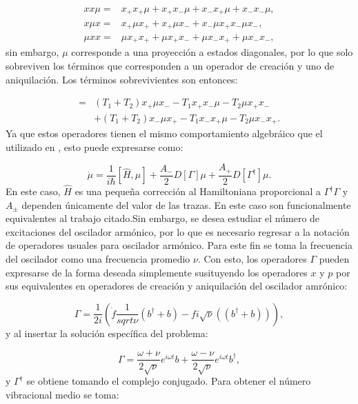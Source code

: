 \documentclass[a4paper,10pt]{report}
\begin{document}
\begin{align}
xx\mu=&x_+x_+\mu + x_+x_-\mu + x_-x_+\mu + x_-x_-\mu,\\
x\mu x=&x_+\mu x_+ + x_+\mu x_- + x_-\mu x_+ x_-\mu x_-,\\
\mu xx=& \mu x_+x_+ + \mu x_+x_-+ \mu x_-x_+ +\mu x_-x_-,
\end{align} sin embargo, $\mu$ corresponde a una proyección a estados diagonales, por lo que solo sobreviven los términos que corresponden a un operador de creación y uno de aniquilación. Los términos sobrevivientes son entonces:

\begin{align}
=&(T_1+T_2)x_+\mu x_- -T_1 x_+x_-\mu - T_2\mu x_+x_- \\ 
&+ \nonumber (T_1+T_2)x_-\mu x_+  -T_1 x_-x_+\mu -T_2 \mu x_-x_+.
\end{align} Ya que estos operadores tienen el mismo comportamiento algebráico que el utilizado en \cite{BarberisLC}, esto puede expresarse como:

\begin{equation}
\dot{\mu} = \frac{1}{i\hbar}[\hat{H},\mu] + \frac{A_-}{2}D[\Gamma]\mu + \frac{A_+}{2}D[\Gamma^\dagger]\mu.
\end{equation} En este caso, $\hat{H}$ es una pequeña corrección al Hamiltoniana proporcional a $\Gamma^\dagger \Gamma$ y $A_\pm$ dependen únicamente del valor de las trazas. En este caso son funcionalmente equivalentes al trabajo citado.Sin embargo, se desea estudiar el número de excitaciones del oscilador armónico, por lo que es necesario regresar a la notación de operadores usuales para oscilador armónico. Para este fin se toma la frecuencia del oscilador como una frecuencia promedio $\nu$. Con esto, los operadores $\Gamma$ pueden expresarse de la forma deseada simplemente susituyendo los operadores $x$ y $p$ por sus equivalentes en operadores de creación y aniquilación del oscilador amrónico:

\begin{equation}
\Gamma = \frac{1}{2i}(\dot{f} \frac{1}{sqrt{\nu}} (b^\dagger + b) - fi\sqrt{\nu}((b^\dagger + b))),
\end{equation} y al insertar la solución específica del problema:

\begin{equation}
\Gamma = \frac{\omega+\nu}{2\sqrt{\nu}}e^{i\omega t}b+\frac{\omega-\nu}{2\sqrt{\nu}}e^{i\omega t}b^\dagger,
\end{equation} y $\Gamma^\dagger$ se obtiene tomando el complejo conjugado. Para obtener el número vibracional medio se toma:
\end{document}
